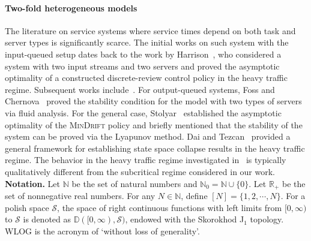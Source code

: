 \documentclass[11pt, reqno]{article}
\numberwithin{equation}{section}
\numberwithin{theorem}{section}
\newcommand{\R}{\mathbb{R}}                 %
\newcommand{\N}{\mathbb{N}}                 %
\begin{document}
\paragraph{Two-fold heterogeneous models}
The literature on service systems where service times depend on both task and server types is significantly scarce. 
The initial works on such system with the input-queued setup dates back to the work by Harrison~\cite{Harrison98}, who considered a system with two input streams and two servers and proved the asymptotic optimality of a constructed discrete-review control policy in the heavy traffic regime.
Subsequent works include~\cite{HL99, MS04}.
For output-queued systems, Foss and Chernova~\cite{FC98} proved the stability condition for the model with two types of servers via fluid analysis. %
For the general case, Stolyar~\cite{AS05} established the asymptotic optimality of the \textsc{MinDrift} policy and briefly mentioned that the stability of the system can be proved via the Lyapunov method. Dai and Tezcan~\cite{DT11} provided a general framework for establishing state space collapse results in the heavy traffic regime. 
The behavior in the heavy traffic regime investigated in~\cite{DT11,AS05} is typically qualitatively different from the subcritical regime considered in our work. \\

                               
\noindent
\textbf{Notation.} 
Let $\N$ be the set of natural numbers and $\N_0=\N\cup \{0\}$. Let $\R_+$ be the set of nonnegative real numbers. 
For any $N\in\N$, define $[N]=\{1,2,\cdots,N\}$.
For a polish space $\mathcal{S}$, the space of right
continuous functions with left limits from $[0,\infty)$ to $\mathcal{S}$ is denoted as $\mathbb{D}([0,\infty),\mathcal{S})$, endowed with the Skorokhod J$_1$ topology. WLOG is the acronym of `without loss of generality'.
 
\end{document}
